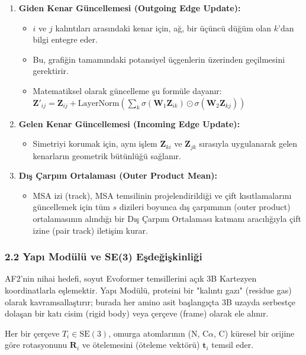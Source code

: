 \documentclass[11pt,a4paper]{article}
\begin{document}
\begin{enumerate}
  \item \textbf{Giden Kenar Güncellemesi (Outgoing Edge Update):}
\begin{itemize}
  \item \(i\) ve \(j\) kalıntıları arasındaki kenar için, ağ, bir üçüncü düğüm olan \(k\)'dan bilgi entegre eder.
  \item Bu, grafiğin tamamındaki potansiyel üçgenlerin üzerinden geçilmesini gerektirir.
  \item Matematiksel olarak güncelleme şu formüle dayanır: \(\mathbf{Z}'_{ij} = \mathbf{Z}_{ij} + \text{LayerNorm} \left( \sum_k \sigma(\mathbf{W}_1 \mathbf{Z}_{ik}) \odot \sigma(\mathbf{W}_2 \mathbf{Z}_{kj}) \right)\)
\end{itemize}
  \item \textbf{Gelen Kenar Güncellemesi (Incoming Edge Update):}
\begin{itemize}
  \item Simetriyi korumak için, aynı işlem \(\mathbf{Z}_{ki}\) ve \(\mathbf{Z}_{jk}\) sırasıyla uygulanarak gelen kenarların geometrik bütünlüğü sağlanır.
\end{itemize}
  \item \textbf{Dış Çarpım Ortalaması (Outer Product Mean):}
\begin{itemize}
  \item MSA izi (track), MSA temsilinin projelendirildiği ve çift kısıtlamalarını güncellemek için tüm \(s\) dizileri boyunca dış çarpımının (outer product) ortalamasının alındığı bir Dış Çarpım Ortalaması katmanı aracılığıyla çift izine (pair track) iletişim kurar.
\end{itemize}
\end{enumerate}
\subsubsection{2.2 Yapı Modülü ve SE(3) Eşdeğişkinliği}
AF2'nin nihai hedefi, soyut Evoformer temsillerini açık 3B Kartezyen koordinatlarla eşlemektir. Yapı Modülü, proteini bir "kalıntı gazı" (residue gas) olarak kavramsallaştırır; burada her amino asit başlangıçta 3B uzayda serbestçe dolaşan bir katı cisim (rigid body) veya çerçeve (frame) olarak ele alınır.

Her bir çerçeve \(T_i \in \text{SE}(3)\), omurga atomlarının (N, C\(\alpha\), C) küresel bir orijine göre rotasyonunu \(\mathbf{R}_i\) ve ötelemesini (öteleme vektörü) \(\mathbf{t}_i\) temsil eder.
\end{document}
